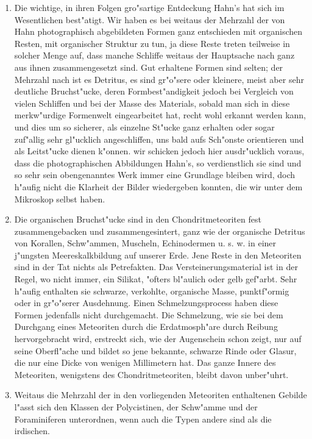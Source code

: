 \documentclass[a4paper, 11pt, oneside]{article}
\begin{document}
\begin{enumerate}
\item Die wichtige, in ihren Folgen gro"sartige Entdeckung Hahn's hat sich im Wesentlichen best"atigt. Wir haben es bei weitaus der Mehrzahl der von Hahn photographisch abgebildeten Formen ganz entschieden mit organischen Resten, mit organischer Struktur zu tun, ja diese Reste treten teilweise in solcher Menge auf, dass manche Schliffe weitaus der Hauptsache nach ganz aus ihnen zusammengesetzt sind. Gut erhaltene Formen sind selten; der Mehrzahl nach ist es Detritus, es sind gr"o"sere oder kleinere, meist aber sehr deutliche Bruchst"ucke, deren Formbest"andigkeit jedoch bei Vergleich von vielen Schliffen und bei der Masse des Materials, sobald man sich in diese merkw"urdige Formenwelt eingearbeitet hat, recht wohl erkannt werden kann, und dies um so sicherer, als einzelne St"ucke ganz erhalten oder sogar zuf"allig sehr gl"ucklich angeschliffen, uns bald aufs Sch"onste orientieren und als Leitst"ucke dienen k"onnen. wir schicken jedoch hier ausdr"ucklich voraus, dass die photographischen Abbildungen Hahn's, so verdienstlich sie sind und so sehr sein obengenanntes Werk immer eine Grundlage bleiben wird, doch h"aufig nicht die Klarheit der Bilder wiedergeben konnten, die wir unter dem Mikroskop selbst haben.
\item Die organischen Bruchst"ucke sind in den Chondritmeteoriten fest zusammengebacken und zusammengesintert, ganz wie der organische Detritus von Korallen, Schw"ammen, Muscheln, Echinodermen u. s. w. in einer j"ungsten Meereskalkbildung auf unserer Erde. Jene Reste in den Meteoriten sind in der Tat nichts als Petrefakten. Das Versteinerungsmaterial ist in der Regel, wo nicht immer, ein Silikat, "ofters bl"aulich oder gelb gef"arbt. Sehr h"aufig enthalten sie schwarze, verkohlte, organische Masse, punktf"ormig oder in gr"o"serer Ausdehnung. Einen Schmelzungsprocess haben diese Formen jedenfalls nicht durchgemacht. Die Schmelzung, wie sie bei dem Durchgang eines Meteoriten durch die Erdatmosph"are durch Reibung hervorgebracht wird, erstreckt sich, wie der Augenschein schon zeigt, nur auf seine Oberfl"ache und bildet so jene bekannte, schwarze Rinde oder Glasur, die nur eine Dicke von wenigen Millimetern hat. Das ganze Innere des Meteoriten, wenigstens des Chondritmeteoriten, bleibt davon unber"uhrt.
\item Weitaus die Mehrzahl der in den vorliegenden Meteoriten enthaltenen Gebilde l"asst sich den Klassen der Polycistinen, der Schw"amme und der Foraminiferen unterordnen, wenn auch die Typen andere sind als die irdischen.

\end{enumerate}
\end{document}
